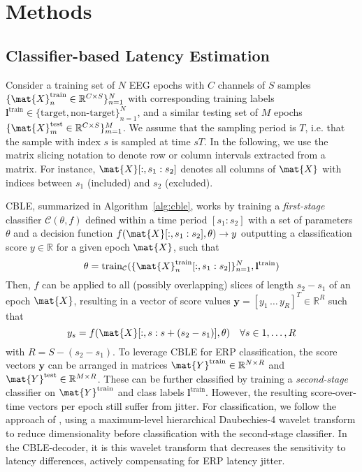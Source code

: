 \section{Methods}

\subsection{Classifier-based Latency Estimation}
\label{sec:cble}

Consider a training set of $N$ EEG epochs with $C$ channels of $S$
samples $\{\mat{X}_n^\mathrm{train} \in \mathbb{R}^{C\times S}\}_{n=1}^N$
with corresponding training labels $\mathbf{l^\mathrm{train}} \in \{\mathrm{target},
	\textrm{non-target}\}_{n=1}^N$, and a
similar testing set of $M$ epochs $\{\mat{X}_m^\mathrm{test} \in
	\mathbb{R}^{C\times S}\}_{m=1}^M$.
We assume that the sampling period is $T$, i.e. that the sample with index $s$ is sampled at time $sT$.
In the following, we use the matrix slicing notation to denote row or column intervals extracted from a matrix.
For instance, $\mat{X}[:,s_1:s_2]$ denotes all columns of $\mat{X}$ with indices between $s_1$ (included) and $s_2$ (excluded).

CBLE, summarized in Algorithm~\ref{alg:cble}, works by training a
\textit{first-stage} classifier $\mathcal{C}(\theta,f)$
defined within a time period $[s_1:s_2]$ with a set of parameters $\theta$ and a
decision function $f(\mat{X}[:,s_1:s_2],\theta) \rightarrow
y$ outputting a classification score $y\in\mathbb{R}$ for a given epoch $\mat{X}$,
such that
\begin{equation}
  \theta = \mathrm{train}_\mathcal{C}(\{\mat{X}_n^\mathrm{train}[:,s_1:s_2]\}_{n=1}^N,\mathbf{l}^\mathrm{train})
  \label{eq:cble-train}
\end{equation}
Then,
$f$ can be applied to all (possibly overlapping) slices of length $s_2-s_1$ of
an epoch $\mat{X}$, resulting in a vector of score values
$\mathbf{y}=[y_1\,\ldots\,y_R]^T \in\mathbb{R}^R$ such that
\begin{equation}
  y_s = f(\mat{X}[:,s:s+(s_2-s_1)],\theta)\quad \forall s\in 1,\ldots,R
	\label{eq:score}
\end{equation}
with $R = S-(s_2-s_1)$.
To leverage CBLE for ERP classification, the score vectors $\mathbf{y}$ can be
arranged in matrices $\mat{Y}^\mathrm{train}\in\mathbb{R}^{N\times R}$ and $\mat{Y}^\mathrm{test}\in\mathbb{R}^{M\times R}$.
These can be further classified by training a \textit{second-stage} classifier on
$\mat{Y}^\mathrm{train}$ and class labels $\mathbf{l}^\mathrm{train}$.
However, the resulting score-over-time vectors per epoch still suffer from jitter.
For classification, we follow the approach of \cite{Mowla2017}, using a
maximum-level hierarchical Daubechies-4 wavelet transform to reduce
dimensionality before classification with the second-stage classifier.
In the CBLE-decoder, it is this wavelet transform that decreases the sensitivity
to latency differences, actively compensating for ERP latency jitter.


